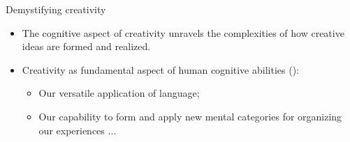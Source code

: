 \documentclass[pdf]{beamer}
\begin{document}

\begin{frame}{Demystifying creativity}
\begin{itemize}
    \item<1-> The cognitive aspect of creativity unravels the complexities of how creative ideas are formed and realized.
    \item<2-> Creativity as fundamental aspect of human cognitive abilities (\cite{ward_creative_1999}):
        \begin{itemize}
            \item<3-> Our versatile application of language;
            \item<4-> Our capability to form and apply new mental categories for organizing our experiences ...
        \end{itemize}
\end{itemize}
\end{frame}
\end{document}
